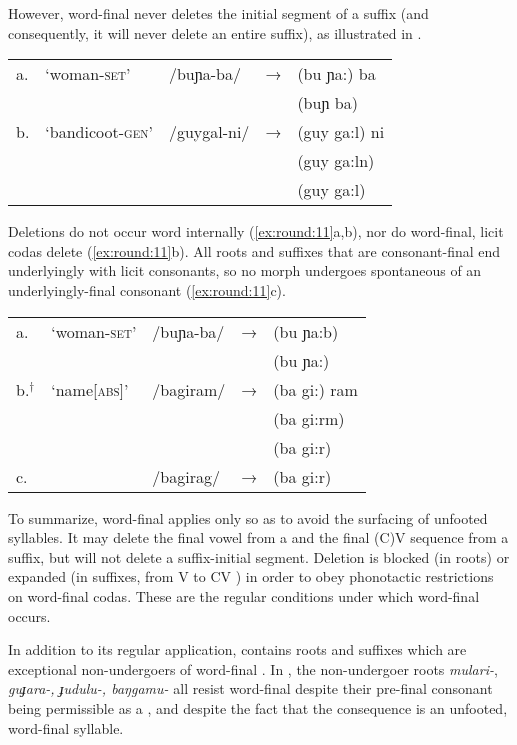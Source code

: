 \documentclass[output=paper,
modfonts
]{LSP/langsci}
\begin{document}
\noindent However, word-final  never deletes the initial segment of a suffix (and consequently, it will never delete an entire suffix), as illustrated in . 

\ea \label{ex:round:10}
\begin{tabular}[t]{@{}lllll}
 a.& `woman-\textsc{set}' & /buɲa-ba/  & → & (bu ɲa:) ba\\
 &&&& \ljudge{*}(buɲ ba) \\
 b. &`bandicoot-\textsc{gen}' & /guygal-ni/  & → & (guy ga:l) ni \\
 &&&& \ljudge{*}(guy ga:ln)\\
 &&&& \ljudge{*}(guy ga:l)\\
 \end{tabular}
 \z
 
\noindent Deletions do not occur word internally (\ref{ex:round:11}a,b), nor do word-final, licit codas delete (\ref{ex:round:11}b). All  roots and suffixes that are consonant-final end underlyingly with licit  consonants, so no morph undergoes spontaneous  of an underlyingly-final consonant (\ref{ex:round:11}c).

\ea \label{ex:round:11} 
\begin{tabular}[t]{@{}lllll}
a. & `woman-\textsc{set}' & /buɲa-ba/  & → & (bu ɲa:b)  \\
&&&& \ljudge{*}(bu ɲa:) \\
b.$^{†}$ & `name[\textsc{abs}]' & /bagiram/  & → & (ba gi:) ram \\
&&&& \ljudge{*}(ba gi:rm)\\
&&&& \ljudge{*}(ba gi:r)\\
c. & & \ljudge{*}/bagirag/  & → & \ljudge{*}(ba gi:r)\\
\end{tabular}
\z

\noindent To summarize, word-final  applies only so as to avoid the surfacing of unfooted syllables. It may delete the final vowel from a  and the final (C)V sequence from a suffix, but will not delete a suffix-initial segment. Deletion is blocked (in roots) or expanded (in suffixes, from V  to CV ) in order to obey phonotactic restrictions on word-final codas. These are the regular conditions under which word-final  occurs.

In addition to its regular application,  contains roots and suffixes which are exceptional non-undergoers of word-final . In , the non-undergoer roots \textit{mulari-}, \textit{guɟara-, ɟudulu-, baŋgamu-} all resist word-final  despite their pre-final consonant being permissible as a , and despite the fact that the consequence is an unfooted, word-final syllable.
\end{document}

